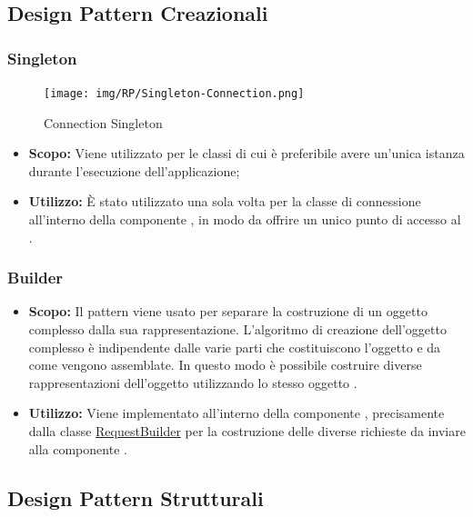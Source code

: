 \documentclass{scalatekids-article}
\begin{document}
\subsection{Design Pattern Creazionali}
\subsubsection{Singleton}

\begin{figure}[H]
  \begin{center}
    \texttt{[image: img/RP/Singleton-Connection.png]}
    \caption{Connection Singleton}
  \end{center}
\end{figure}

\begin{itemize}
\item \textbf{Scopo:} Viene utilizzato per le classi di cui è preferibile avere un'unica istanza
  durante l'esecuzione dell'applicazione;
\item \textbf{Utilizzo:} È stato utilizzato una sola volta per la classe di connessione all'interno
  della componente , in modo da offrire un unico punto di accesso al .
\end{itemize}

\subsubsection{Builder}

\begin{itemize}
\item \textbf{Scopo:} Il pattern  viene usato per separare la
  costruzione di un oggetto complesso dalla sua rappresentazione. L'algoritmo di
  creazione dell'oggetto complesso è indipendente dalle varie parti che
  costituiscono l'oggetto e da come vengono assemblate. In questo modo è possibile
  costruire diverse rappresentazioni dell'oggetto utilizzando lo stesso oggetto
  .

\item \textbf{Utilizzo:} Viene implementato all'interno della componente
  , precisamente dalla classe
  \hyperref[sec:actorbase::driver::client::api::RequestBuilder]{RequestBuilder} per
  la costruzione delle diverse richieste  da inviare alla componente .
\end{itemize}

\subsection{Design Pattern Strutturali}
\end{document}

